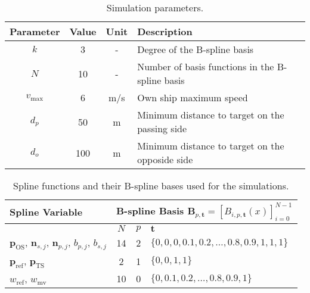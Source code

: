 \renewcommand{\arraystretch}{1.2}
\begin{table}[htbp]
    \centering
    \begin{tabular}{|c|c|c|p{7cm}|}
        \hline
        \textbf{Parameter} & \textbf{Value} & \textbf{Unit} & \textbf{Description} \\
        \hline
        \rule{0pt}{2.5ex}$k$ & 3 & - & Degree of the B-spline basis \\
        \hline
        \rule{0pt}{2.5ex}$N$ & 10 & - & Number of basis functions in the B-spline basis \\
        \hline
        \rule{0pt}{2.5ex}$v_\text{max}$ & 6 & m/s & Own ship maximum speed \\
        \hline
        \rule{0pt}{2.5ex}$d_p$ & 50 & m & Minimum distance to target on the passing side \\
        \hline
        \rule{0pt}{2.5ex}$d_o$ & 100 & m & Minimum distance to target on the opposide side \\
        \hline
    \end{tabular}
    \caption{Simulation parameters.}
    \label{tab:simulation-parameters}
\end{table}
\renewcommand{\arraystretch}{1.0}

\renewcommand{\arraystretch}{1.2}
\begin{table}[htbp]
    \centering
    \begin{tabular}{|p{2.5cm}||c|c|l|}
        \hline
        \rule{0pt}{2.5ex}
        \textbf{Spline Variable} & \multicolumn{3}{c|}{\textbf{B-spline Basis} $\mathbf{B}_{p, \mathbf t} = [B_{i, p, \mathbf t}(x)]_{i=0}^{N-1}$} \\[0.4ex]
        \hline
        & $N$ & $p$ & $\mathbf{t}$ \\
        \hline
        \hline
        $\mathbf{p}_\text{OS}$, $\mathbf{n}_{s, j}$, $\mathbf{n}_{p, j}$, $b_{p,j}$, $b_{s,j}$ 
        & 14 & 2 & $\{0, 0, 0, 0.1, 0.2, \ldots, 0.8, 0.9, 1, 1, 1\}$ \\
        \hline
        $\mathbf{p}_\text{ref}$, $\mathbf{p}_\text{TS}$ & 2 & 1 & $\{0, 0, 1, 1\}$ \\
        \hline
        $w_\text{ref}$, $w_\text{mv}$ & 10 & 0 & $\{0, 0.1, 0.2, \ldots, 0.8, 0.9, 1\}$ \\
        \hline
    \end{tabular}
    \caption{Spline functions and their B-spline bases used for the simulations.}\label{tab:sim-spline-basis}
\end{table}
\renewcommand{\arraystretch}{1.0}


